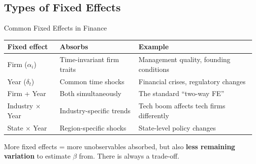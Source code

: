 \documentclass[9pt,aspectratio=169]{beamer}
\begin{document}
\subsection{Types of Fixed Effects}
\begin{frame}{Common Fixed Effects in Finance}

\begin{tabular}{@{}llp{5.5cm}@{}}
\toprule
\textbf{Fixed effect} & \textbf{Absorbs} & \textbf{Example} \\
\midrule
Firm ($\alpha_i$) & Time-invariant firm traits & Management quality, founding conditions \\[0.5em]
Year ($\delta_t$) & Common time shocks & Financial crises, regulatory changes \\[0.5em]
Firm + Year & Both simultaneously & The standard ``two-way FE'' \\[0.5em]
Industry $\times$ Year & Industry-specific trends & Tech boom affects tech firms differently \\[0.5em]
State $\times$ Year & Region-specific shocks & State-level policy changes \\
\bottomrule
\end{tabular}

\bigskip

\begin{highlightbox}
\centering
More fixed effects = more unobservables absorbed, but also \textbf{less remaining variation} to estimate $\beta$ from. There is always a trade-off.
\end{highlightbox}

\end{frame}
\end{document}
